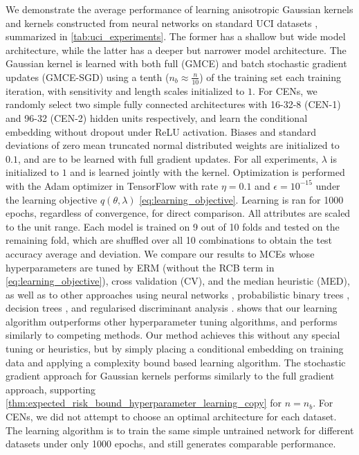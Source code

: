 \documentclass[twoside]{article}
\begin{document}
		We demonstrate the average performance of learning anisotropic Gaussian kernels and kernels constructed from neural networks on standard UCI datasets \citep{bache2013uci}, summarized in \cref{tab:uci_experiments}. The former has a shallow but wide model architecture, while the latter has a deeper but narrower model architecture. The Gaussian kernel is learned with both full (G\gls{MCE}) and batch stochastic gradient updates (G\gls{MCE}-SGD) using a tenth ($n_{b} \approx \frac{n}{10}$) of the training set each training iteration, with sensitivity and length scales initialized to $1$. For \glspl{CEN}, we randomly select two simple fully connected architectures with 16-32-8 (\gls{CEN}-1) and 96-32 (\gls{CEN}-2) hidden units respectively, and learn the conditional embedding without dropout under ReLU activation. Biases and standard deviations of zero mean truncated normal distributed weights are initialized to $0.1$, and are to be learned with full gradient updates. For all experiments, $\lambda$ is initialized to $1$ and is learned jointly with the kernel. Optimization is performed with the Adam optimizer \citep{kingma2014adam} in TensorFlow \citep{abadi2016tensorflow} with rate $\eta = 0.1$ and $\epsilon = 10^{-15}$ under the learning objective $q(\theta, \lambda)$ \eqref{eq:learning_objective}. Learning is ran for 1000 epochs, regardless of convergence, for direct comparison. All attributes are scaled to the unit range. Each model is trained on 9 out of 10 folds and tested on the remaining fold, which are shuffled over all 10 combinations to obtain the test accuracy average and deviation. We compare our results to \glspl{MCE} whose hyperparameters are tuned by \gls{ERM} (without the \gls{RCB} term in \eqref{eq:learning_objective}), cross validation (CV), and the median heuristic (MED), as well as to other approaches using neural networks \citep[a; c]{kaya2016banknote, freire2009short}, probabilistic binary trees \citep[b]{horton1996probabilistic}, decision trees \citep[d]{zhou2004size}, and regularised discriminant analysis \citep[e]{aeberhard1992comparison}.  shows that our learning algorithm outperforms other hyperparameter tuning algorithms, and performs similarly to competing methods. Our method achieves this without any special tuning or heuristics, but by simply placing a conditional embedding on training data and applying a complexity bound based learning algorithm. The stochastic gradient approach for Gaussian kernels performs similarly to the full gradient approach, supporting \cref{thm:expected_risk_bound_hyperparameter_learning_copy} for $n = n_{b}$. For \glspl{CEN}, we did not attempt to choose an optimal architecture for each dataset. The learning algorithm is to train the same simple untrained network for different datasets under only 1000 epochs, and still generates comparable performance. 
	
\end{document}
